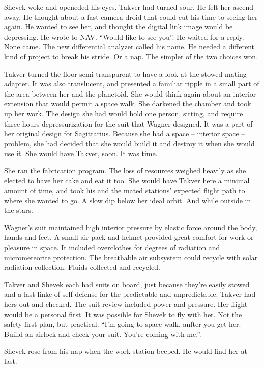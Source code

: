 Shevek woke and openeded his eyes.  Takver had turned sour.  He felt
her ascend away.  He thought about a fast camera droid that could cut
his time to seeing her again.  He wanted to see her, and thought the
digital link image would be depressing.  He wrote to NAV.  ``Would
like to see you''.  He waited for a reply.  None came.  The new
differential analyzer called his name.  He needed a different kind of
project to break his stride.  Or a nap.  The simpler of the two
choices won.

Takver turned the floor semi-transparent to have a look at the stowed
mating adapter.  It was also translucent, and presented a familiar
ripple in a small part of the area between her and the planetoid.  She
would think again about an interior extension that would permit a
space walk.  She darkened the chamber and took up her work.  The
design she had would hold one person, sitting, and require three hours
depressurization for the suit that Wagner designed.  It was a part of
her original design for Sagittarius.  Because she had a space --
interior space -- problem, she had decided that she would build it and
destroy it when she would use it.  She would have Takver, soon.  It
was time.

She ran the fabrication program.  The loss of resources weighed
heavily as she elected to have her cake and eat it too.  She would
have Takver here a minimal amount of time, and took his and the mated
stations' expected flight path to where she wanted to go.  A slow dip
below her ideal orbit.  And while outside in the stars.

Wagner's suit maintained high interior pressure by elastic force
around the body, hands and feet.  A small air pack and helmet provided
great comfort for work or pleasure in space.  It included overclothes
for degrees of radiation and micrometeorite protection.  The
breathable air subsystem could recycle with solar radiation
collection.  Fluids collected and recycled.

Takver and Shevek each had suits on board, just because they're easily
stowed and a last linke of self defense for the predictable and
unpredictable.  Takver had hers out and checked.  The suit review
included power and pressure.  Her flight would be a personal first.
It was possible for Shevek to fly with her.  Not the safety first
plan, but practical.  ``I'm going to space walk, anfter you get her.
Buiild an airlock and check your suit.  You're coming with me.''.

Shevek rose from his nap when the work station beeped.  He would find
her at last.

